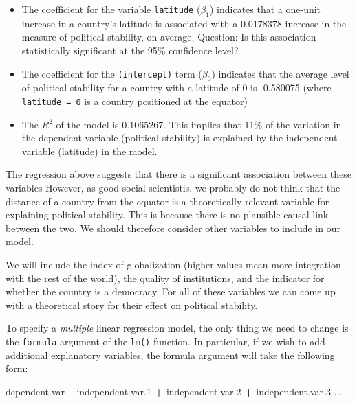 \documentclass[]{article}
\newenvironment{Shaded}{\begin{snugshade}}{\end{snugshade}}
\newcommand{\FloatTok}[1]{\textcolor[rgb]{0.00,0.00,0.81}{#1}}
\newcommand{\NormalTok}[1]{#1}
\newcommand{\OperatorTok}[1]{\textcolor[rgb]{0.81,0.36,0.00}{\textbf{#1}}}
\newcommand{\StringTok}[1]{\textcolor[rgb]{0.31,0.60,0.02}{#1}}
\providecommand{\tightlist}{%
  \setlength{\itemsep}{0pt}\setlength{\parskip}{0pt}}
\begin{document}
\begin{itemize}
\tightlist
\item
  The coefficient for the variable \texttt{latitude} (\(\beta_1\)) indicates that a one-unit increase in a country's latitude is associated with a 0.0178378 increase in the measure of political stability, on average. Question: Is this association statistically significant at the 95\% confidence level?
\item
  The coefficient for the \texttt{(intercept)} term (\(\beta_0\)) indicates that the average level of political stability for a country with a latitude of 0 is -0.580075 (where \texttt{latitude\ =\ 0} is a country positioned at the equator)
\item
  The \(R^2\) of the model is 0.1065267. This implies that 11\% of the variation in the dependent variable (political stability) is explained by the independent variable (latitude) in the model.
\end{itemize}

The regression above suggests that there is a significant association between these variables However, as good social scientistis, we probably do not think that the distance of a country from the equator is a theoretically relevant variable for explaining political stability. This is because there is no plausible causal link between the two. We should therefore consider other variables to include in our model.

We will include the index of globalization (higher values mean more integration with the rest of the world), the quality of institutions, and the indicator for whether the country is a democracy. For all of these variables we can come up with a theoretical story for their effect on political stability.

To specify a \emph{multiple} linear regression model, the only thing we need to change is the \texttt{formula} argument of the \texttt{lm()} function. In particular, if we wish to add additional explanatory variables, the formula argument will take the following form:

\begin{Shaded}
\begin{Highlighting}[]
\NormalTok{dependent.var }\OperatorTok{~}\StringTok{ }\NormalTok{independent.var}\FloatTok{.1} \OperatorTok{+}\StringTok{ }\NormalTok{independent.var}\FloatTok{.2} \OperatorTok{+}\StringTok{ }\NormalTok{independent.var}\FloatTok{.3}\NormalTok{ ...}
\end{Highlighting}
\end{Shaded}
\end{document}
